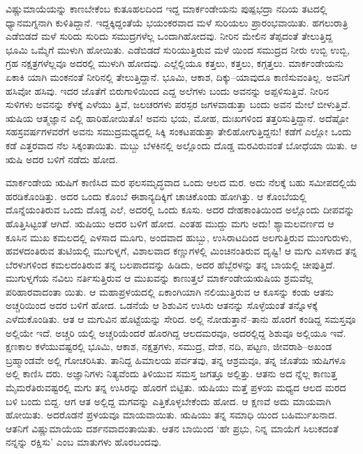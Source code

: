 ವಿಷ್ಣುಮಾಯೆಯನ್ನು ಕಾಣಬೇಕೆಂಬ ಕುತೂಹಲದಿಂದ ಇದ್ದ ಮಾರ್ಕಂಡೇಯನು ಪುಷ್ಪಭದ್ರಾ ನದಿಯ ತಟದಲ್ಲಿ ಧ್ಯಾನಮಗ್ನನಾಗಿ ಕುಳಿತಿದ್ದಾನೆ. ಇದ್ದಕ್ಕಿದ್ದಂತೆಯೆ ಭಯಂಕರವಾದ ಮಳೆ ಸುರಿಯಲು ಪ್ರಾರಂಭವಾಯಿತು. ಹಗಲುರಾತ್ರಿ ಎಡೆಬಿಡದೆ ಮಳೆ ಸುರಿದು ಸುರಿದು ಸಮುದ್ರಗಳೆಲ್ಲ ಒಂದಾಗಿಹೋದವು. ನೀರಿನ ಮೇಲಿನ ತೆಪ್ಪದಂತೆ ತೇಲುತ್ತಿದ್ದ ಭೂಮಿ ಒಮ್ಮೆಗೆ ಮುಳುಗಿ ಹೋಯಿತು. ಎಡೆಬಿಡದೆ ಸುರಿಯುತ್ತಿರುವ ಮಳೆ ಯಿಂದ ಸಮುದ್ರದ ನೀರು ಉಬ್ಬಿ ಉಬ್ಬಿ, ಗ್ರಹ ನಕ್ಷತ್ರಗಳೆಲ್ಲವೂ ಅದರಲ್ಲಿ ಮುಳುಗಿ ಹೋದವು. ಎಲ್ಲೆಲ್ಲಿಯೂ ಕತ್ತಲು, ಕತ್ತಲು, ಕಗ್ಗತ್ತಲು. ಮಾರ್ಕಂಡೇಯನು ಏಕಾಕಿ ಯಾಗಿ ಮಂಕನಂತೆ ನೀರಿನಲ್ಲಿ ತೇಲುತ್ತಿದ್ದಾನೆ. ಭೂಮಿ, ಆಕಾಶ, ದಿಕ್ಕು–ಯಾವುದೂ ಕಾಣಿಸುವಂತಿಲ್ಲ. ಅವನಿಗೆ ಹಸಿವೋ ಹಸಿವು. ಇದರ ಜೊತೆಗೆ ಬಿರುಗಾಳಿಯಿಂದ ಎದ್ದ ಅಲೆಗಳು ಬಂದು ಅವನನ್ನು ಅಪ್ಪಳಿಸುತ್ತಿವೆ. ನೀರಿನ ಸುಳಿಗಳು ಅವನನ್ನು ಕೆಳಕ್ಕೆ ಎಳೆಯು ತ್ತಿವೆ, ಜಲಚರಗಳು ಪರಸ್ಪರ ಜಗಳವಾಡುತ್ತಾ ಬಂದು ಅವನ ಮೇಲೆ ಬೀಳುತ್ತಿವೆ. ಋಷಿಯ ಆತ್ಮಜ್ಞಾನ ಎಲ್ಲಿ ಹಾರಿಹೋಯಿತೊ! ಅವನು ಭಯ, ಮೋಹ, ದುಃಖಗಳಿಂದ ತತ್ತರಿಸುತ್ತಿದ್ದಾನೆ. ಅದೆಷ್ಟೋ ಸಹಸ್ರವರ್ಷಗಳವರೆಗೆ ಅವನು ಸಮುದ್ರಮಧ್ಯದಲ್ಲಿ ಸಿಕ್ಕಿ ಸಂಕಟಪಡುತ್ತಾ ತೇಲಿಹೋಗುತ್ತಿದ್ದನು! ಕಡೆಗೆ ಎಲ್ಲೋ ಒಂದು ಕಡೆ ಎತ್ತರವಾದ ನೆಲ ಸಿಕ್ಕಂತಾಯಿತು. ಮಬ್ಬು ಬೆಳಕಿನಲ್ಲಿ ಅಲ್ಲೊಂದು ದೊಡ್ಡ ಮರವಿರುವಂತೆ ಬೋಧೆಯಾ ಯಿತು. ಆ ಋಷಿ ಅದರ ಬಳಿಗೆ ನಡೆದು ಹೋದ.

ಮಾರ್ಕಂಡೇಯ ಋಷಿಗೆ ಕಾಣಿಸಿದ ಮರ ಫಲಸಮೃದ್ಧವಾದ ಒಂದು ಆಲದ ಮರ. ಅದು ನೆಲಕ್ಕೆ ಬಹು ಸಮೀಪದಲ್ಲಿಯೆ ಹರಡಿಕೊಂಡಿತ್ತು. ಅದರ ಒಂದು ಕೊಂಬೆ ಈಶಾನ್ಯದಿಕ್ಕಿಗೆ ಚಾಚಿಕೊಂಡು ಹೋಗಿತ್ತು. ಆ ಕೊಂಬೆಯಲ್ಲಿ ದೊನ್ನೆಯಂತಿರುವ ಒಂದು ದೊಡ್ಡ ಎಲೆ, ಅದರಲ್ಲಿ ಒಂದು ಕೂಸು. ಅದರ ದೇಹಕಾಂತಿಯಿಂದ ಅಲ್ಲೊಂದು ದೀಪವನ್ನು ಹೊತ್ತಿಸಿಟ್ಟಂತೆ ಆಗಿದೆ. ಋಷಿಯು ಅದರ ಬಳಿಗೆ ಹೋದ. ಎಂತಹ ಮುದ್ದು ಮಗು ಅದು! ಶ್ಯಾಮಲವರ್ಣದ ಆ ಕೂಸಿನ ಮುಖ ಕಮಲದಲ್ಲಿ ಎಳಸಾದ ಮೂಗು, ಅಂದವಾದ ಹುಬ್ಬು, ಉಸಿರಾಟದಿಂದ ಅಲಗುತ್ತಿರುವ ಮುಂಗುರುಳು, ಹವಳದಂತಿರುವ ತುಟಿಯಲ್ಲಿ ಮುಗುಳ್ನಗೆ, ವಿಶಾಲವಾದ ಕಣ್ಣುಗಳಲ್ಲಿ ಮಿಂಚಿನಂತಿರುವ ದೃಷ್ಟಿ! ಆ ಮಗು ಎಸಳಾದ ತನ್ನ ಬೆರಳುಗಳಿಂದ ಕಮಲದಂತಿರುವ ತನ್ನ ಬಲಪಾದವನ್ನು ಹಿಡಿದು, ಅದರ ಹೆಬ್ಬೆರಳನ್ನು ತನ್ನ ಬಾಯಲ್ಲಿ ಚೀಪುತ್ತಿದೆ. ಮುಗುಳ್ನಗೆಯ ನವಿಲು ನರ್ತಿಸುತ್ತಿರುವ ಆ ಮುಖವನ್ನು ಕಾಣುತ್ತಲೆ ಮಾರ್ಕಂಡೇಯಋಷಿಯ ಶ್ರಮವೆಲ್ಲ ಪರಿಹಾರವಾದಂತಾ ಯಿತು. ಆ ಮಹಾಪ್ರಳಯದಲ್ಲಿ ಏಕಾಂಗಿಯಾಗಿ ನಲಿಯುತ್ತಿರುವ ಆ ಕೂಸನ್ನು ಕಂಡು ಆತನು ಅಚ್ಚರಿಯಿಂದ ಅದರ ಬಳಿಗೆ ಹೋದ. ಒಡನೆಯೆ ಆ ಶಿಶುವಿನ ಉಸಿರು ಆತನನ್ನು ಸೊಳ್ಳೆಯಂತೆ ತನ್ನೊಳಕ್ಕೆ ಎಳೆದುಕೊಂಡಿತು. ಆತ ಆ ಮಗುವಿನ ಹೊಟ್ಟೆಯನ್ನು ಸೇರಿದ. ಅಲ್ಲಿ ನೋಡುತ್ತಾನೆ–ತಾನು ಹೊರಗೆ ಕಂಡಿದ್ದ ಸಮಸ್ತವೂ ಅಲ್ಲಿಯೇ ಇದೆ. ಅಚ್ಚರಿ ಯಲ್ಲಿ ಅಚ್ಚರಿಯೆಂದರೆ ಹೊರಗಿದ್ದ ಆಲದಮರವೂ, ಅದರಲ್ಲಿದ್ದ ಶಿಶುವೂ ಅಲ್ಲಿಯೂ ಇವೆ. ಕ್ಷಣಕಾಲ ಕಳೆಯುವಷ್ಟರಲ್ಲಿ ಭೂಮಿ, ಆಕಾಶ, ನಕ್ಷತ್ರಗಳು, ಸಮುದ್ರ, ದೇಶ, ನದಿ, ಪಟ್ಟಣ, ಜೀವರಾಶಿ–ಅಖಂಡ ಬ್ರಹ್ಮಾಂಡವೇ ಅಲ್ಲಿ ಗೋಚರಿಸಿತು. ತಾನಿದ್ದ ಹಿಮಾಲಯ ಪರ್ವತವು, ತನ್ನ ಆಶ್ರಮವೂ, ತನ್ನ ಜೊತೆಯ ಋಷಿಗಳೂ ಅಲ್ಲಿ ಕಾಣಿಸಿ ದರು. ಅಜ್ಞಾನಿಗಳು ನಿತ್ಯವೆಂದು ತಿಳಿಯುವ ಸಮಸ್ತ ಜಗತ್ತೂ ಅಲ್ಲಿತ್ತು. ಆತನು ಅದ ನ್ನೆಲ್ಲ ಕಾಣುತ್ತ ಮೈಮರೆತಿರುವಷ್ಟರಲ್ಲಿ ಮಗು ತನ್ನ ಉಸಿರನ್ನು ಹೊರಗೆ ಬಿಟ್ಟಿತು. ಋಷಿಯು ಮತ್ತೆ ಪ್ರಳಯ ಮಧ್ಯದ ಆಲದ ಮರದ ಬಳಿ ಬಂದು ಬಿದ್ದ. ಆಗ ಆತ ಅಲ್ಲಿದ್ದ ಮಗವನ್ನು ಎತ್ತಿಕೊಳ್ಳಬೇಕೆಂದು ಹೋದ. ಆ ಕ್ಷಣವೆ ಅದು ಮಾಯವಾಗಿ ಹೋಯಿತು. ಅದರೊಡನೆ ಪ್ರಳಯವೂ ಮಾಯವಾಯಿತು. ಋಷಿಯು ತನ್ನ ಸಮಾಧಿ ಯಿಂದ ಬಹಿರ್ಮುಖನಾದ. ಆತನಿಗೆ ವಿಷ್ಣುಮಾಯೆಯ ದರ್ಶನವಾದಂತಾಯಿತು. ಆತನ ಬಾಯಿಂದ ‘ಹೇ ಪ್ರಭು, ನಿನ್ನ ಮಾಯೆಗೆ ಸಿಲುಕದಂತೆ ನನ್ನನ್ನು ರಕ್ಷಿಸು’ ಎಂಬ ಮಾತುಗಳು ಹೊರಬಂದವು.

